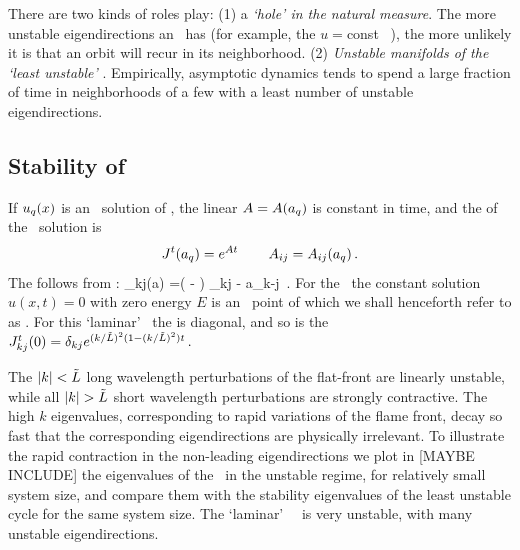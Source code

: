 %
There are two kinds of roles
{\eqva} play:
(1)
a {\em `hole' in the natural measure}.
The more unstable eigendirections an \eqv\ has (for example, the
$u=$const \eqv~), the more unlikely it is  that
an orbit will recur in its neighborhood.
(2)
{\em Unstable manifolds of the `least unstable' {\eqva}}.
Empirically, asymptotic dynamics tends to spend
a large fraction of time in
neighborhoods of a few  {\eqva} with
a least number of unstable eigendirections.



\subsection{Stability of \eqva}
\label{s:StabEqui}

If $u_q(x)$ is an \eqv\ solution of \KSe,
the linear {\stabmat}
${A}={A}(a_q)$
is constant in time,
and
the {\jacobianM}
of the \eqv\ solution is
\[
 {J}^t(a_q) = e^{{A} t}
    \,\qquad
 A_{ij}= A_{ij}(a_q)
\,.
\]
The {\stabmat}
follows from :
\beq
{\Mvar}_{kj}(a) %
=\left(  -   \right)
  \delta_{kj} -  a_{k-j}
\,.
For the \KSe\ the constant solution $u(x,t)=0$ with zero energy $E$ is an
\eqv\ point of  which we shall henceforth refer to as
. For this `laminar' \eqv\ the {\stabmat}
is diagonal, and
so is the {\jacobianM}
$
{J}^t_{kj}(0) = \delta_{kj} e^{(k/\tilde{L})^2(1- (k/\tilde{L})^2)t}
\,.
$

The $|k|<\tilde{L}$
long wavelength perturbations of the flat-front {\eqv}
are linearly unstable, while all
$|k|> \tildeL$ short wavelength perturbations are strongly contractive.
The high $k$ eigenvalues, corresponding to rapid variations of
the flame front, decay so fast that the corresponding eigendirections
are physically irrelevant.
To illustrate the rapid contraction in the non-leading eigendirections
we plot  in [MAYBE INCLUDE] %
the eigenvalues of the \eqv\ in the unstable regime,
for relatively small system size, %
and compare them with the
stability eigenvalues of the least unstable cycle for the same
system size.
The `laminar' ~\eqv\ is very unstable,
with many unstable eigendirections.


